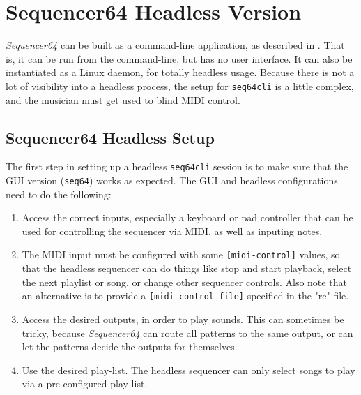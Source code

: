 %
%
%

\section{Sequencer64 Headless Version}
\label{sec:headless}

   \textsl{Sequencer64} can be built as a command-line application,
   as described in .
   That is, it can be run from the command-line, but has no user interface.
   It can also be instantiated as a Linux daemon, for totally headless usage.
   Because there is not a lot of visibility into a headless process, the
   setup for \texttt{seq64cli} is a little complex, and the musician must get
   used to blind MIDI control.

\subsection{Sequencer64 Headless Setup}
\label{subsec:headless_setup}

   The first step in setting up a headless \texttt{seq64cli} session is
   to make sure that the GUI version (\texttt{seq64}) works as expected.
   The GUI and headless configurations need to do the following:
   
   \begin{enumerate}
      \item Access the correct inputs, especially a keyboard or pad controller
         that can be used for controlling the sequencer via MIDI, as well as
         inputing notes.
      \item The MIDI input must be configured with some \texttt{[midi-control]}
         values, so that the headless sequencer can do things like stop and
         start playback, select the next playlist or song, or change other
         sequencer controls.  Also note that an alternative is to provide a 
         \texttt{[midi-control-file]} specified in the "rc" file.
      \item Access the desired outputs, in order to play sounds.  This can
         sometimes be tricky, because \textsl{Sequencer64} can route all
         patterns to the same output, or can let the patterns decide the
         outputs for themselves.
      \item Use the desired play-list.  The headless sequencer can only select
         songs to play via a pre-configured play-list.
   \end{enumerate}

